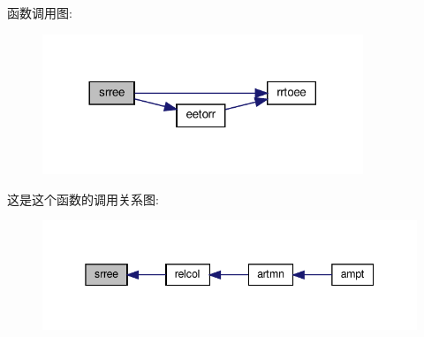 函数调用图\+:
\nopagebreak
\begin{figure}[H]
\begin{center}
\leavevmode
\includegraphics[width=272pt]{srree_8f90_ac4135dd8570d022e350bf9755917de91_cgraph}
\end{center}
\end{figure}
这是这个函数的调用关系图\+:
\nopagebreak
\begin{figure}[H]
\begin{center}
\leavevmode
\includegraphics[width=345pt]{srree_8f90_ac4135dd8570d022e350bf9755917de91_icgraph}
\end{center}
\end{figure}
